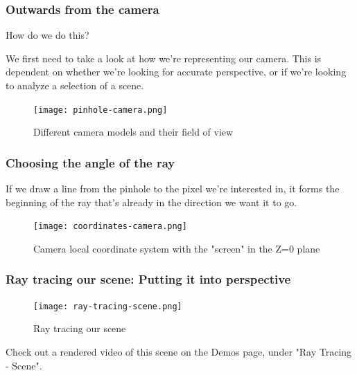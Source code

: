 \documentclass[12pt]{beamer}
\begin{document}
  \begin{frame}
    \frametitle{Outwards from the camera}

    How do we do this?

    We first need to take a look at how we're representing our camera.
    This is dependent on whether we're looking for accurate perspective, or if we're looking to analyze a selection of a scene.



    \begin{figure}
      \centering
      \texttt{[image: pinhole-camera.png]}
      \caption{Different camera models and their field of view}\label{fig:camera-models}
    \end{figure}

  \end{frame}

  \begin{frame}
    \frametitle{Choosing the angle of the ray}

    If we draw a line from the pinhole to the pixel we're interested in, it forms the beginning of the ray that's already in the direction we want it to go.

    \begin{figure}
      \centering
      \texttt{[image: coordinates-camera.png]}
      \caption{Camera local coordinate system with the "screen" in the Z=0 plane}\label{fig:camera-coordinates}
    \end{figure}



  \end{frame}

  \begin{frame}
    \frametitle{Ray tracing our scene: Putting it into perspective}

    \begin{figure}
      \centering
      \texttt{[image: ray-tracing-scene.png]}
      \caption{Ray tracing our scene}\label{fig:ray-tracing-scene}
    \end{figure}


    Check out a rendered video of this scene on the Demos page, under "Ray Tracing - Scene".

  \end{frame}
\end{document}
